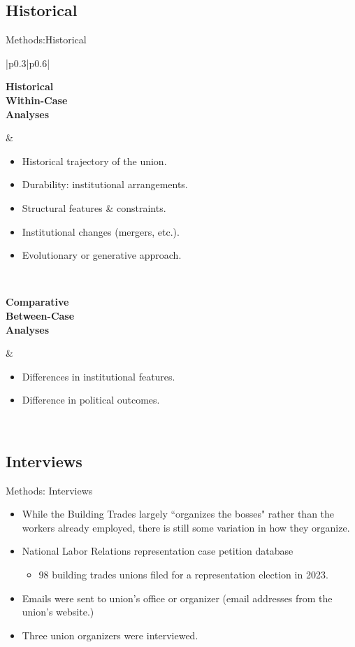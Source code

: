 \documentclass{beamer}
\begin{document}
\subsection{Historical}
\begin{frame}{Methods:Historical}
\setlength{\arrayrulewidth}{0.0pt} %
\begin{tabular}{|p{0.3\textwidth}|p{0.6\textwidth}|}
\hline
\begin{minipage}[t][0.2\textheight][t]{\linewidth}
\textbf{Historical\\
Within-Case\\
Analyses}
\end{minipage}
&
\begin{itemize}
    \item Historical trajectory of the union.
    \item Durability: institutional arrangements.
    \item Structural features \& constraints.
    \item Institutional changes (mergers, etc.).
    \item Evolutionary or generative approach. %
\end{itemize}
\\
\hline
\begin{minipage}[c][0.2\textheight][b]{\linewidth}
\textbf{Comparative\\
Between-Case\\
Analyses}
\end{minipage}
&
\begin{itemize}
    \item Differences in institutional features.
    \item Difference in political outcomes.
\end{itemize}
\\
\hline
\end{tabular}
\end{frame}

\subsection{Interviews}
\begin{frame}{Methods: Interviews}
\begin{itemize}
	\item While the Building Trades largely ``organizes the bosses" rather than the workers already employed, there is still some variation in how they organize. 
	\item National Labor Relations representation case petition database
	\begin{itemize}
		\item 98 building trades unions filed for a representation election in 2023.
	\end{itemize}		 
	\item Emails were sent to union's office or organizer (email addresses from the union's website.)
	\item Three union organizers were interviewed.
\end{itemize}
\end{frame}
\end{document}
